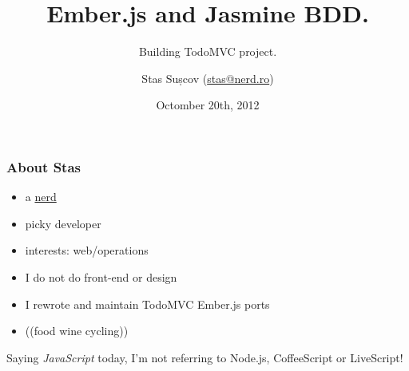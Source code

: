 \documentclass[compress]{beamer}
\title{Ember.js and Jasmine BDD.}
\subtitle{Building TodoMVC project.}
\author{Stas Sușcov (\href{mailto:stas@nerd.ro}{stas@nerd.ro})}
\date{Octomber 20th, 2012}
\institute{GeekMeet \#12, Cluj-Napoca, Transilvania}
\begin{document}
\maketitle

\begin{frame}
\frametitle{About Stas}

\begin{itemize}[<+->]
  \item a \href{http://stas.nerd.ro}{nerd}
  \item picky developer
  \item interests: web/operations
  \item I do not do front-end or design
  \item I rewrote and maintain TodoMVC Ember.js ports
  \item (\Heart (food wine cycling))
\end{itemize}
\end{frame}

\begin{frame}
  \begin{center}
    \huge Saying \emph{JavaScript} today, I'm not referring to Node.js, CoffeeScript or LiveScript!
  \end{center}
\end{frame}
\end{document}
